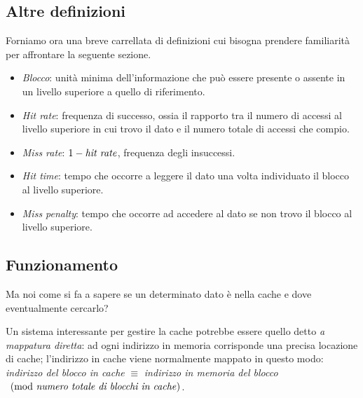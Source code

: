 \documentclass[class=book, crop=false, oneside]{standalone}
\begin{document}
\subsection*{Altre definizioni}
Forniamo ora una breve carrellata di definizioni cui bisogna prendere familiarità per affrontare la seguente sezione.
\begin{itemize}
  \item \emph{Blocco}: unità minima dell'informazione che può essere presente o assente in un livello superiore a quello di riferimento.
  \item \emph{Hit rate}: frequenza di successo, ossia il rapporto tra il numero di accessi al livello superiore in cui trovo il dato e il numero totale di accessi che compio.
  \item \emph{Miss rate}: \(1 - \textrm{\emph{hit rate}}\), frequenza degli insuccessi.
  \item \emph{Hit time}: tempo che occorre a leggere il dato una volta individuato il blocco al livello superiore.
  \item \emph{Miss penalty}: tempo che occorre ad accedere al dato se non trovo il blocco al livello superiore.
\end{itemize}

\subsection{Funzionamento}
Ma noi come si fa a sapere se un determinato dato è nella cache e dove eventualmente cercarlo?

Un sistema interessante per gestire la cache potrebbe essere quello detto \emph{a mappatura diretta}: ad ogni indirizzo in memoria corrisponde una precisa locazione di cache; l'indirizzo in cache viene normalmente mappato in questo modo: \emph{indirizzo del blocco in cache} \(\equiv\) \emph{indirizzo in memoria del blocco}  \(\pmod{\textrm{\emph{numero totale di blocchi in cache}}}\).
\end{document}
